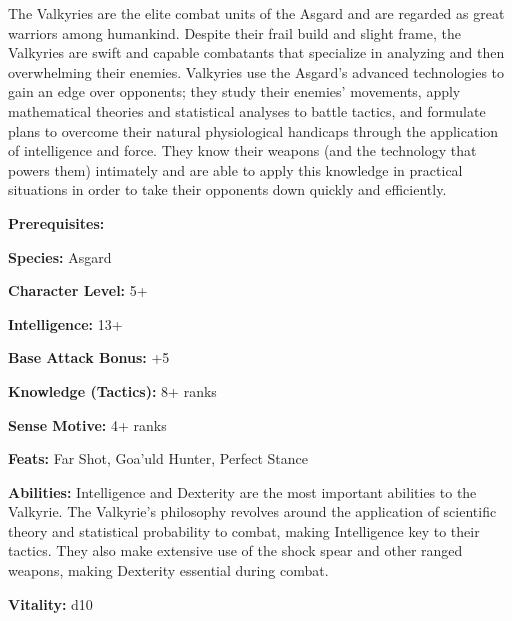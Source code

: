 \begin{multicols}{2}

The Valkyries are the elite combat units of the Asgard and are regarded as great warriors among humankind. Despite their frail build and slight frame, the Valkyries are swift and capable combatants that specialize in analyzing and then overwhelming their enemies. Valkyries use the Asgard's advanced technologies to gain an edge over opponents; they study their enemies' movements, apply mathematical theories and statistical analyses to battle tactics, and formulate plans to overcome their natural physiological handicaps through the application of intelligence and force. They know their weapons (and the technology that powers them) intimately and are able to apply this knowledge in practical situations in order to take their opponents down quickly and efficiently.

\columnbreak

\textbf{Prerequisites:} 
\begin{description*}
\item[\hspace{1.5cm}\textbf{Species:}] Asgard
\item[\hspace{1.5cm}\textbf{Character Level:}] 5+
\item[\hspace{1.5cm}\textbf{Intelligence:}] 13+
\item[\hspace{1.5cm}\textbf{Base Attack Bonus:}] +5
\item[\hspace{1.5cm}\textbf{Knowledge (Tactics):}] 8+ ranks
\item[\hspace{1.5cm}\textbf{Sense Motive:}] 4+ ranks
\item[\hspace{1.5cm}\textbf{Feats:}] Far Shot, Goa'uld Hunter, Perfect Stance
\end{description*}

\textbf{Abilities:} Intelligence and Dexterity are the most important abilities to the Valkyrie. The Valkyrie's philosophy revolves around the application of scientific theory and statistical probability to combat, making Intelligence key to their tactics. They also make extensive use of the shock spear and other ranged weapons, making Dexterity essential during combat.

\textbf{Vitality:} d10

\end{multicols}

